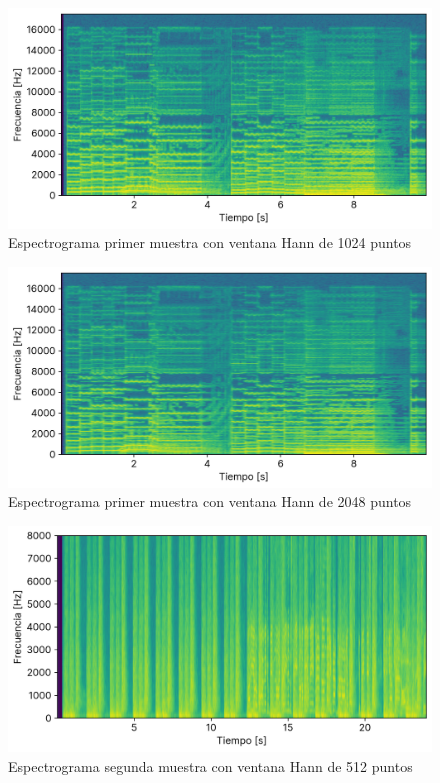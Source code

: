 \documentclass[12pt]{article}
\begin{document}
\begin{figure}[H]
\centering
\includegraphics{plot/cancion1_espectograma_hann_1024.png}
\caption{Espectrograma primer muestra con ventana Hann de 1024 puntos}
\label{cancion1_espectograma_hann_1024}
\end{figure}

\begin{figure}[H]
\centering
\includegraphics{plot/cancion1_espectograma_hann_2048.png}
\caption{Espectrograma primer muestra con ventana Hann de 2048 puntos}
\label{cancion1_espectograma_hann_2048}
\end{figure}

\begin{figure}[H]
\centering
\includegraphics{plot/cancion2_espectograma_hann_0512.png}
\caption{Espectrograma segunda muestra con ventana Hann de 512 puntos}
\label{cancion2_espectograma_hann_0512}
\end{figure}
\end{document}
